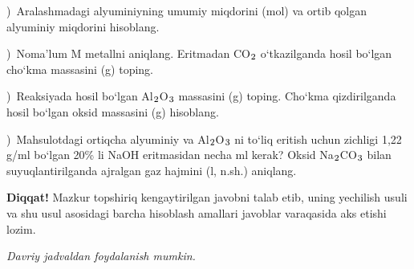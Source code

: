 \documentclass[11pt,a4paper]{article}
\renewcommand{\textsubscript}[1]{\ensuremath{_{\text{\fontsize{8}{8}\selectfont #1}}}}
\newcommand{\qsep}{\par\vspace{13pt}}
\newcommand{\diqqat}[1]{\par\smallskip\noindent\textbf{Diqqat!} #1\par\medskip}
\newcommand{\hdrpill}[1]{\begin{tikzpicture}[baseline=0pt]\node[fill=ygreen,text=white,rounded corners=8pt,inner xsep=10pt,inner ysep=5pt,font=\fontsize{13}{15}\bfseries\selectfont] at (0,0.475){#1};\end{tikzpicture}}
\newcommand{\curvar}{}\fancyhead[R]{\hdrpill{\curvar}}
\begin{document}
)\ Aralashmadagi alyuminiyning umumiy miqdorini (mol) va ortib qolgan alyuminiy miqdorini hisoblang.\par
{})\ Noma'lum M metallni aniqlang. Eritmadan CO\textsubscript{2} o`tkazilganda hosil bo`lgan cho`kma massasini (g) toping.\par
{})\ Reaksiyada hosil bo`lgan Al\textsubscript{2}O\textsubscript{3} massasini (g) toping. Cho`kma qizdirilganda hosil bo`lgan oksid massasini (g) hisoblang.\par
{})\ Mahsulotdagi ortiqcha alyuminiy va Al\textsubscript{2}O\textsubscript{3} ni to`liq eritish uchun zichligi 1,22 g/ml bo`lgan 20\% li NaOH eritmasidan necha ml kerak? Oksid Na\textsubscript{2}CO\textsubscript{3} bilan suyuqlantirilganda ajralgan gaz hajmini (l, n.sh.) aniqlang.\par
\diqqat{Mazkur topshiriq kengaytirilgan javobni talab etib, uning yechilish usuli va shu usul asosidagi barcha hisoblash amallari javoblar varaqasida aks etishi lozim.}\qsep
\newpage
\renewcommand{\curvar}{5-variant}
\thispagestyle{first}
\noindent\textit{Davriy jadvaldan foydalanish mumkin.}
\par\smallskip
\end{document}
